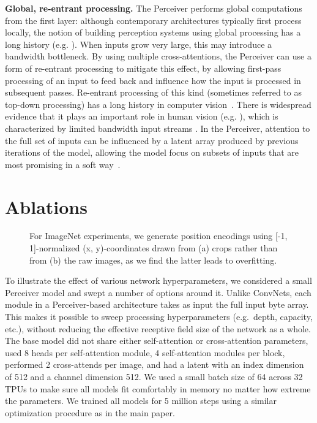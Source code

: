 \documentclass{article}
\begin{document}
\noindent \textbf{Global, re-entrant processing.} The Perceiver performs global computations from the first layer: although contemporary architectures typically first process locally, the notion of building perception systems using global processing has a long history (e.g. \citealt{kohler1967gestalt,shi2000normalized}). When inputs grow very large, this may introduce a bandwidth bottleneck. By using multiple cross-attentions, the Perceiver can use a form of re-entrant processing to mitigate this effect, by allowing first-pass processing of an input to feed back and influence how the input is processed in subsequent passes. Re-entrant processing of this kind (sometimes referred to as top-down processing) has a long history in computer vision~\cite{borenstein2004combining,kumar2005obj,carreira2016human,hu2016bottom,yang2018convolutional,lin2020context}. There is widespread evidence that it plays an important role in human vision (e.g. \citealt{felleman1991distributed, olshausen1993neurobiological, lollo2000competition}), which is characterized by limited bandwidth input streams \cite{wolfe2006changes}. In the Perceiver, attention to the full set of inputs can be influenced by a latent array produced by previous iterations of the model, allowing the model focus on subsets of inputs that are most promising in a soft way~\cite{zoran2020towards}.

\section{Ablations}
\label{sec:supp_ablations}

\begin{figure}[]
    \centering
    \caption{For ImageNet experiments, we generate position encodings using [-1, 1]-normalized (x, y)-coordinates drawn from (a) crops rather than from (b) the raw images, as we find the latter leads to overfitting.}
    \label{fig:cropping}
    \vspace{-6pt}
\end{figure}

To illustrate the effect of various network hyperparameters, we considered a small Perceiver model and swept a number of options around it. Unlike ConvNets, each module in a Perceiver-based architecture takes as input the full input byte array. This makes it possible to sweep processing hyperparameters (e.g.\ depth, capacity, etc.), without reducing the effective receptive field size of the network as a whole. The base model did not share either self-attention or cross-attention parameters, used 8 heads per self-attention module, 4 self-attention modules per block, performed 2 cross-attends per image, and had a latent with an index dimension of 512 and a channel dimension 512. We used a small batch size of 64 across 32 TPUs to make sure all models fit comfortably in memory no matter how extreme the parameters. We trained all models for 5 million steps using a similar optimization procedure as in the main paper. 
\end{document}
